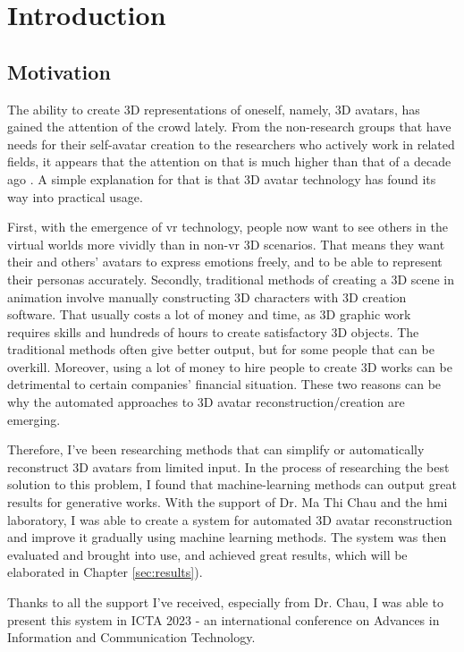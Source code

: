 \section{Introduction}
\label{sec:intro}

\subsection{Motivation}
\label{sec:intro/motivation}
The ability to create 3D representations of oneself, namely, 3D avatars, has gained the attention of the crowd lately. From the non-research groups that have needs for their self-avatar creation to the researchers who actively work in related fields, it appears that the attention on that is much higher than that of a decade ago \citationneeded. A simple explanation for that is that 3D avatar technology has found its way into practical usage.



First, with the emergence of \gls{vr} technology, people now want to see others in the virtual worlds more vividly than in non-\gls{vr} 3D scenarios. That means they want their and others' avatars to express emotions freely, and to be able to represent their personas accurately. Secondly, traditional methods of creating a 3D scene in animation involve manually constructing 3D characters with 3D creation software. That usually costs a lot of money and time, as 3D graphic work requires skills and hundreds of hours to create satisfactory 3D objects. The traditional methods often give better output, but for some people that can be overkill. Moreover, using a lot of money to hire people to create 3D works can be detrimental to certain companies' financial situation. These two reasons can be why the automated approaches to 3D avatar reconstruction/creation are emerging.


Therefore, I've been researching methods that can simplify or automatically reconstruct 3D avatars from limited input. In the process of researching the best solution to this problem, I found that machine-learning methods can output great results for generative works. With the support of Dr. Ma Thi Chau and the \gls{hmi} laboratory, I was able to create a system for automated 3D avatar reconstruction and improve it gradually using machine learning methods. The system was then evaluated and brought into use, and achieved great results, which will be elaborated in Chapter \ref{sec:results}).


Thanks to all the support I've received, especially from Dr. Chau, I was able to present this system in ICTA 2023 - an international conference on Advances in Information and Communication Technology.



